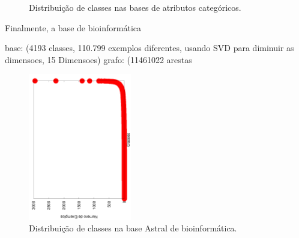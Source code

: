 \begin{figure}[h]

\caption{Distribuição de classes nas bases de atributos categóricos.}
\label{fig::basescategorias}
\end{figure}


Finalmente, a base de bioinformática

base: (4193 classes, 110.799 exemplos diferentes, usando SVD para diminuir as dimensoes, 15 Dimensoes)
grafo: (11461022 arestas 


\begin{figure}[h]
  \centering
  \includegraphics[angle=270, width=0.40\textwidth]{figures/perfil/astral.png}
 \caption{Distribuição de classes na base Astral de bioinformática.}
\label{fig::basesbio}
\end{figure}

